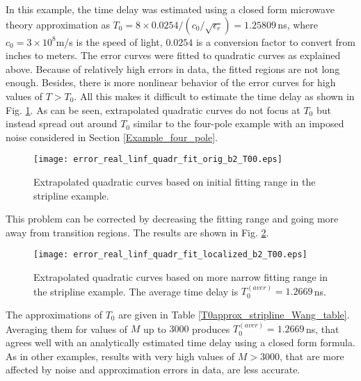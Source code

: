 \documentclass[journal,twoside]{IEEEtran}
\begin{document}
In this example, the time delay was estimated using a closed form microwave theory approximation as $T_0=8 \times 0.0254/(c_0/ \sqrt{\epsilon _r})= 1.25809$\,ns, where $c_0=3\times 10^{8}$m/s is the speed of light, $0.0254$ is a conversion factor to convert from inches to meters. The error curves were fitted to quadratic curves as explained above. Because of relatively high errors in data, the fitted regions are not long enough. 
Besides, there is more nonlinear behavior of the error curves for high values of $T> T_0$. All this 
makes it difficult to estimate the time delay as shown in Fig. \ref{Wang2}. As can be seen, extrapolated quadratic curves do not focus at $T_0$ but instead spread out around $T_0$ similar to the four-pole example with an imposed noise considered in Section \ref{Example_four_pole}.
\begin{figure} \begin{center}
\texttt{[image: error\_real\_linf\_quadr\_fit\_orig\_b2\_T00.eps]}
\end{center}
\caption{Extrapolated quadratic curves based on initial  fitting range in the stripline example.}
\label{Wang2}
\end{figure}
This problem can be corrected by decreasing the fitting range and going more away from transition regions. The results are shown in Fig. \ref{Wang3}. 
\begin{figure} \begin{center}
\texttt{[image: error\_real\_linf\_quadr\_fit\_localized\_b2\_T00.eps]}
\end{center}
\caption{Extrapolated quadratic curves based on more narrow  fitting range in the stripline example. The average time delay is $T_0^{(aver)}=1.2669$\,ns.}
\label{Wang3}
\end{figure}
The approximations of $T_0$ are given in Table \ref{T0approx_stripline_Wang_table}. Averaging them for values of $M$ up to $3000$ produces
$T_0^{(aver)}=1.2669$\,ns, that agrees well with an analytically estimated time delay using a closed form formula. As in other examples, results with very high values of $M>3000$, that are more affected by noise and approximation errors in data, are less accurate.
\end{document}
